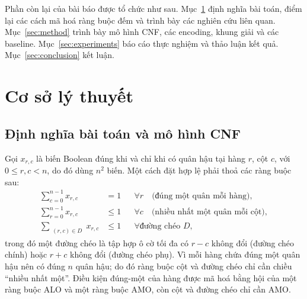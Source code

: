\documentclass[a4paper,fleqn]{cas-sc}
\begin{document}
Phần còn lại của bài báo được tổ chức như sau. Mục~\ref{sec:background} định
nghĩa bài toán, điểm lại các cách mã hoá ràng buộc đếm và trình bày các nghiên
cứu liên quan. Mục~\ref{sec:method} trình bày mô hình CNF, các encoding, khung
giải và các baseline. Mục~\ref{sec:experiments} báo cáo thực nghiệm và thảo luận
kết quả. Mục~\ref{sec:conclusion} kết luận.

\section{Cơ sở lý thuyết}\label{sec:background}

\subsection{Định nghĩa bài toán và mô hình CNF}
Gọi $x_{r,c}$ là biến Boolean đúng khi và chỉ khi có quân hậu tại hàng $r$, cột
$c$, với $0 \leq r,c < n$, do đó dùng $n^2$ biến. Một cách đặt hợp lệ phải thoả
các ràng buộc sau:
\begin{align}
  \sum_{c=0}^{n-1} x_{r,c} &= 1 && \forall r \quad \text{(đúng một quân mỗi hàng)},\\
  \sum_{r=0}^{n-1} x_{r,c} &\leq 1 && \forall c \quad \text{(nhiều nhất một quân mỗi cột)},\\
  \sum_{\substack{(r,c)\in D}} x_{r,c} &\leq 1 && \forall \text{đường chéo } D ,
\end{align}
trong đó một đường chéo là tập hợp ô cờ tối đa có $r-c$ không đổi (đường chéo
chính) hoặc $r+c$ không đổi (đường chéo phụ). Vì mỗi hàng chứa đúng một quân
hậu nên có đúng $n$ quân hậu; do đó ràng buộc cột và đường chéo chỉ cần chiều
``nhiều nhất một''. Điều kiện đúng-một của hàng được mã hoá bằng hội của một
ràng buộc ALO và một ràng buộc AMO, còn cột và đường chéo chỉ cần AMO.
\end{document}
